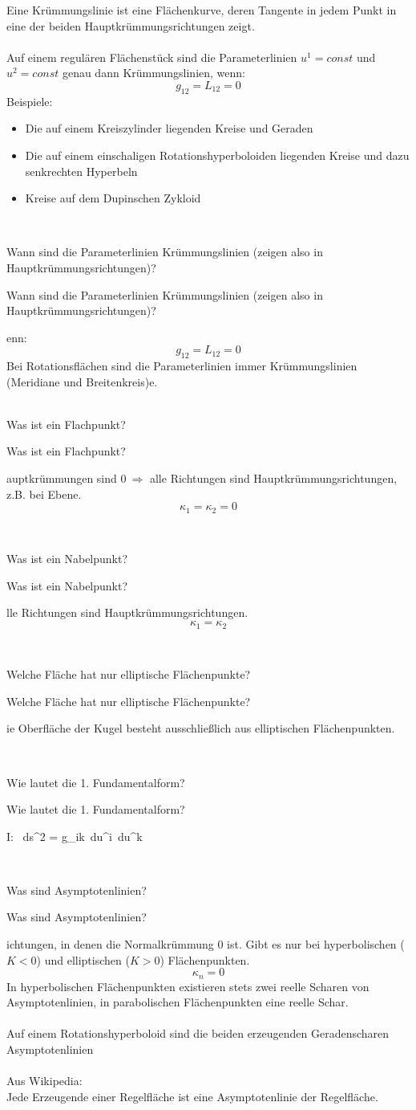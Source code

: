 \documentclass[DIV=1]{scrartcl}
\newcommand{\frage}[3][10]{
    \newpage
    \ 
    \vspace{#1 em}
    \begin{framed}
        #2
    \end{framed}
    \newpage
    \begin{framed}
        #2
    \end{framed}
    \vspace{2 em}
}
\begin{document}
Eine Krümmungslinie ist eine Flächenkurve, deren Tangente in jedem Punkt in eine der beiden Hauptkrümmungsrichtungen zeigt.\\
\\
Auf einem regulären Flächenstück sind die Parameterlinien $u^1 = const$ und $u^2 = const$ genau dann Krümmungslinien, wenn:
\[
    g_{12} = L_{12} = 0
\]
Beispiele:\\
\begin{itemize}
    \item Die auf einem Kreiszylinder liegenden Kreise und Geraden
    \item Die auf einem einschaligen Rotationshyperboloiden liegenden Kreise und dazu senkrechten Hyperbeln
    \item Kreise auf dem Dupinschen Zykloid
\end{itemize}



\frage{Wann sind die Parameterlinien Krümmungslinien (zeigen also in Hauptkrümmungsrichtungen)?}

Wenn:
\[
    g_{12} = L_{12} = 0
\]
Bei Rotationsflächen sind die Parameterlinien immer Krümmungslinien (Meridiane und Breitenkreis)e.\\



\frage{ Was ist ein Flachpunkt?}

Hauptkrümmungen sind $0\ \Rightarrow$ alle Richtungen sind Haupt\-krüm\-mungs\-rich\-tung\-en, z.B. bei Ebene.
\[
    \kappa_1 = \kappa_2 = 0
\]



\frage{Was ist ein Nabelpunkt?}

Alle Richtungen sind Hauptkrümmungsrichtungen.
\[
    \kappa_1 = \kappa_2
\]



\frage{Welche Fläche hat nur elliptische Flächenpunkte?}

Die Oberfläche der Kugel besteht ausschließlich aus elliptischen Flächen\-punkten.



\frage{Wie lautet die 1. Fundamentalform?}

\[
    I: \ ds^2 = g_{ik}\, du^i\, du^k
\]



\frage{Was sind Asymptotenlinien?}

Richtungen, in denen die Normalkrümmung $0$ ist. Gibt es nur bei hyperbolischen ($K<0$) und elliptischen ($K>0$) Flächenpunkten.
\[
    \kappa_n = 0
\]
In hyperbolischen Flächenpunkten existieren stets zwei reelle Scharen von Asymptotenlinien, in parabolischen Flächenpunkten eine reelle Schar.\\
\\
Auf einem Rotationshyperboloid sind die beiden erzeugenden Geradenscharen Asymptotenlinien\\
\\
Aus Wikipedia:\\
Jede Erzeugende einer Regelfläche ist eine Asymptotenlinie der Regelfläche.
\end{document}
